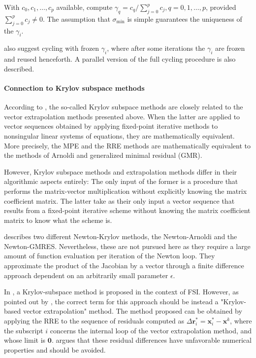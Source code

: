 With \(c_{0}, c_{1}, \ldots, c_{p}\) available, compute \(\gamma_{q}=c_{q} / \sum_{j=0}^{p} c_{j}, q=0,1, \ldots, p\), provided \(\sum_{j=0}^{p} c_{j} \neq 0\).
The assumption that \(\sigma_{\min }\) is simple guarantees the uniqueness of the \(\gamma_{i}\).

\cite{sidi_vector_2017} also suggest cycling with frozen \(\gamma_i\), where after some iterations the \(\gamma_i\) are frozen and reused henceforth.
A parallel version of the full cycling procedure is also described.

\paragraph{Connection to Krylov subspace methods}

According to \cite{sidi_vector_2017}, the so-called Krylov subspace methods are closely related to the vector extrapolation methods presented above.
When the latter are applied to vector sequences obtained by applying fixed-point iterative methods to nonsingular linear systems of equations, they are mathematically equivalent.
More precisely, the MPE and the RRE methods are mathematically equivalent to the methods of Arnoldi and generalized minimal residual (GMR).

However, Krylov subspace methods and extrapolation methods differ in their algorithmic aspects entirely:
The only input of the former is a procedure that performs the matrix-vector multiplication without explicitly knowing the matrix coefficient matrix.
The latter take as their only input a vector sequence that results from a fixed-point iterative scheme without knowing the matrix coefficient matrix to know what the scheme is.

\cite{sidi_vector_2017} describes two different Newton-Krylov methods, the Newton-Arnoldi and the Newton-GMRES.
Nevertheless, these are not pursued here as they require a large amount of function evaluation per iteration of the Newton loop. They approximate the product of the Jacobian by a vector through a finite difference approach dependent on an arbitrarily small parameter \(\epsilon\).

In \cite{michler_interface_2005}, a Krylov-subspace method is proposed in the context of FSI.
However, as pointed out by \cite{kuttler_vector_2009}, the correct term for this approach should be instead a "Krylov-based vector extrapolation" method.
The method proposed can be obtained by applying the RRE to the sequence of residuals computed as
\(\Delta \mathbf r^*_i = \mathbf x^*_i - \mathbf x^k\), where the subscript \(i\) concerns the internal loop of the vector extrapolation method, and whose limit is \(\mathbf 0\).
\cite{kuttler_vector_2009} argues that these residual differences have unfavorable numerical properties and should be avoided.




